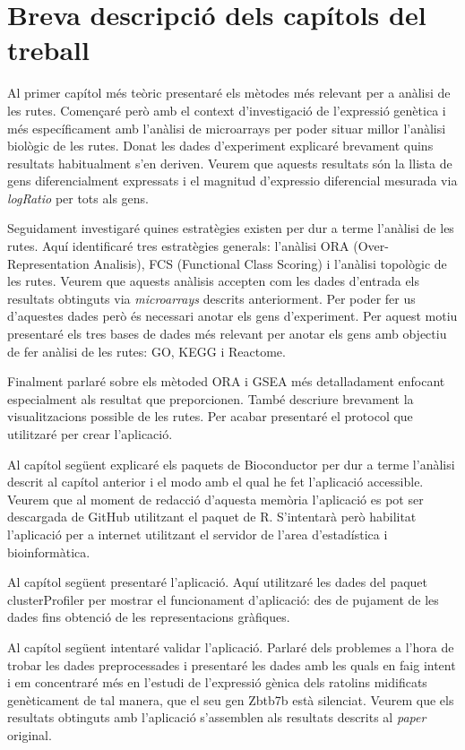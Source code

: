 \section{Breva descripció dels capítols del treball}

Al primer capítol més teòric presentaré els mètodes més relevant per a anàlisi de les rutes. Començaré però amb el context d'investigació de l'expressió genètica i més específicament amb l'anàlisi de microarrays per poder situar millor l'anàlisi biològic de les rutes. Donat les dades d'experiment explicaré brevament quins resultats habitualment s'en deriven. Veurem que aquests resultats són la llista de gens diferencialment expressats i el magnitud d'expressio diferencial mesurada via \textit{logRatio} per tots als gens. 

Seguidament investigaré quines estratègies existen per dur a terme l'anàlisi de les rutes. Aquí identificaré tres estratègies generals: l'anàlisi ORA (Over-Representation Analisis), FCS (Functional Class Scoring) i l'anàlisi topològic de les rutes. Veurem que aquests anàlisis accepten com les dades d'entrada els resultats obtinguts via \textit{microarrays} descrits anteriorment. Per poder fer us d'aquestes dades però és necessari anotar els gens d'experiment. Per aquest motiu presentaré els tres bases de dades més relevant per anotar els gens amb objectiu de fer anàlisi de les rutes: GO, KEGG i Reactome.

Finalment parlaré sobre els mètoded ORA i GSEA més detalladament enfocant especialment als resultat que preporcionen. També descriure brevament la visualitzacions possible de les rutes. Per acabar presentaré el protocol que utilitzaré per crear l'aplicació.

Al capítol següent explicaré els paquets de Bioconductor per dur a terme l'anàlisi descrit al capítol anterior i el modo amb el qual he fet l'aplicació accessible. Veurem que al moment de redacció d'aquesta memòria l'aplicació es pot ser descargada de GitHub utilitzant el paquet  de R. S'intentarà però habilitat l'aplicació  per a internet utilitzant el servidor de l'area d'estadística i bioinformàtica. 

Al capítol següent presentaré l'aplicació. Aquí utilitzaré les dades del paquet clusterProfiler per mostrar el funcionament d'aplicació: des de pujament de les dades fins obtenció de les representacions gràfiques.

Al capítol següent intentaré validar l'aplicació. Parlaré dels problemes a l'hora de trobar les dades preprocessades i presentaré les dades amb les quals en faig intent i em concentraré més en l'estudi de l'expressió gènica dels ratolins midificats genèticament de tal manera, que el seu gen  Zbtb7b està silenciat. Veurem que els resultats obtinguts amb l'aplicació s'assemblen als resultats descrits al \textit{paper} original. 

